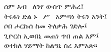 \documentclass[10pt]{book}
\begin{document}
%

\frontmatter

\mainmatter

\clearpage
{}



\begin{CJK*}{JIS}{song}

ሰም እብ \ ለንየ ውስጥ ምሕረ፤ \\
ትሩፋነ ድል ኑ \ ሥ \ አምጣነ ትሩን አንት፤ \\
ሶበ ሖርኩሰ ከመ ትለቃሕ ገድሎ፤ \\
ጊዮርስ ኢወበኒ መጠነ ጥበ ጠል እም፤\\
ወተክለ ሃይማት ከልዓኒ ስረ እምአጽ። 

\end{CJK*}

\printindex
\end{document}
